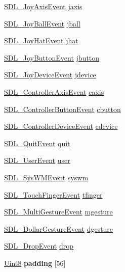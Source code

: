 \begin{DoxyCompactItemize}
\hyperlink{struct_s_d_l___joy_axis_event}{S\+D\+L\+\_\+\+Joy\+Axis\+Event} \hyperlink{union_s_d_l___event_a4b6be0bb6f456b320e33d344ae3da7c5}{jaxis}
\item 
\hyperlink{struct_s_d_l___joy_ball_event}{S\+D\+L\+\_\+\+Joy\+Ball\+Event} \hyperlink{union_s_d_l___event_a3a7002a9bea0e40a43f41df855bc9782}{jball}
\item 
\hyperlink{struct_s_d_l___joy_hat_event}{S\+D\+L\+\_\+\+Joy\+Hat\+Event} \hyperlink{union_s_d_l___event_aea419b4a0b6aa542b5e3c8378b488dd7}{jhat}
\item 
\hyperlink{struct_s_d_l___joy_button_event}{S\+D\+L\+\_\+\+Joy\+Button\+Event} \hyperlink{union_s_d_l___event_ad723f7a3adf34248d74786401a257cd3}{jbutton}
\item 
\hyperlink{struct_s_d_l___joy_device_event}{S\+D\+L\+\_\+\+Joy\+Device\+Event} \hyperlink{union_s_d_l___event_a3cc807a742e4243fe2e46276ebac7290}{jdevice}
\item 
\hyperlink{struct_s_d_l___controller_axis_event}{S\+D\+L\+\_\+\+Controller\+Axis\+Event} \hyperlink{union_s_d_l___event_af8486acab465238416da493c3cc9fc13}{caxis}
\item 
\hyperlink{struct_s_d_l___controller_button_event}{S\+D\+L\+\_\+\+Controller\+Button\+Event} \hyperlink{union_s_d_l___event_a3737e24bb0b43344c5c0c42a3bd164fa}{cbutton}
\item 
\hyperlink{struct_s_d_l___controller_device_event}{S\+D\+L\+\_\+\+Controller\+Device\+Event} \hyperlink{union_s_d_l___event_a03c83f444a0a9d6f2e7d86244f61e663}{cdevice}
\item 
\hyperlink{struct_s_d_l___quit_event}{S\+D\+L\+\_\+\+Quit\+Event} \hyperlink{union_s_d_l___event_a08f33cf663e5a5227cc5b681017af20c}{quit}
\item 
\hyperlink{struct_s_d_l___user_event}{S\+D\+L\+\_\+\+User\+Event} \hyperlink{union_s_d_l___event_a32ed3513e4b2533a94bb7bc123294720}{user}
\item 
\hyperlink{struct_s_d_l___sys_w_m_event}{S\+D\+L\+\_\+\+Sys\+W\+M\+Event} \hyperlink{union_s_d_l___event_a97fa33bbc633db23ef6e2df72ad7d7d2}{syswm}
\item 
\hyperlink{struct_s_d_l___touch_finger_event}{S\+D\+L\+\_\+\+Touch\+Finger\+Event} \hyperlink{union_s_d_l___event_a7c9be16d80e9c03a6ef9154be5de440e}{tfinger}
\item 
\hyperlink{struct_s_d_l___multi_gesture_event}{S\+D\+L\+\_\+\+Multi\+Gesture\+Event} \hyperlink{union_s_d_l___event_aa0605c4f966521b135a1a429a2a255f4}{mgesture}
\item 
\hyperlink{struct_s_d_l___dollar_gesture_event}{S\+D\+L\+\_\+\+Dollar\+Gesture\+Event} \hyperlink{union_s_d_l___event_a695fce66f9cbe412fbe3fa2bb4b17eb8}{dgesture}
\item 
\hyperlink{struct_s_d_l___drop_event}{S\+D\+L\+\_\+\+Drop\+Event} \hyperlink{union_s_d_l___event_a248bdfd9877f986c05513b9362039bf0}{drop}
\item 
\hyperlink{_s_d_l__stdinc_8h_a2944638813a090aa23e62f4da842c3e2}{Uint8} {\bfseries padding} \mbox{[}56\mbox{]}\hypertarget{union_s_d_l___event_a867c3daad8f34d3e1fd2432ef29af45a}{}\label{union_s_d_l___event_a867c3daad8f34d3e1fd2432ef29af45a}


\end{DoxyCompactItemize}
